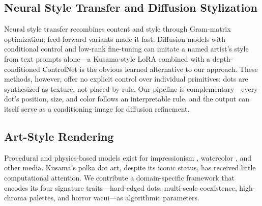 \subsection{Neural Style Transfer and Diffusion Stylization}

Neural style transfer \citep{gatys2015neural} recombines content and
style through Gram-matrix optimization; feed-forward variants
\citep{johnson2016perceptual,ulyanov2016instance} made it fast.
Diffusion models \citep{rombach2022high} with conditional control
\citep{zhang2023adding} and low-rank fine-tuning \citep{hu2022lora}
can imitate a named artist's style from text prompts alone---a
Kusama-style LoRA combined with a depth-conditioned ControlNet is the
obvious learned alternative to our approach. These methods, however,
offer no explicit control over individual primitives: dots are
synthesized as texture, not placed by rule. Our pipeline is
complementary---every dot's position, size, and color follows an
interpretable rule, and the output can itself serve as a conditioning
image for diffusion refinement.

\subsection{Art-Style Rendering}

Procedural and physics-based models exist for impressionism
\citep{litwinowicz1997processing,hertzmann1998painterly}, watercolor
\citep{curtis1997computer}, and other media. Kusama's polka dot art,
despite its iconic status, has received little computational
attention. We contribute a domain-specific framework that encodes its
four signature traits---hard-edged dots, multi-scale coexistence,
high-chroma palettes, and horror vacui---as algorithmic parameters.
